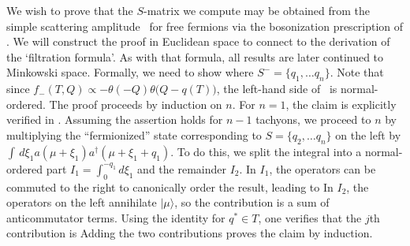  
 
We wish to prove that the $S$-matrix we compute may be obtained from the 
simple scattering amplitude \sff\ for free fermions via the bosonization
prescription of \bosnztion. We will construct the proof in Euclidean space to
connect to the derivation of the `filtration formula'. As with that formula,
all results are later continued to Minkowski space.
Formally, we need to show 
\eqn{}
where $S^- = \{q_1,\ldots q_n \}$.
Note that since 
$f_-(T,Q) \propto - \theta (-Q) \theta \big(Q-q(T)\big)$, the
left-hand side of \bozinc\ is normal-ordered.
The proof proceeds by induction on $n$. For $n = 1$, the claim is
explicitly verified in \bosnztion.
Assuming the assertion holds for $n-1$ tachyons, we proceed to $n$ by
multiplying the ``fermionized'' state corresponding to 
$S=\{q_2,\ldots q_n\}$
on the left by 
$\int\, d\xi_1 a (\mu + \xi_1) a^{\dagger}(\mu + \xi_1 + q_1)$. 
To do this, we split the integral into a
normal-ordered part $I_1 = \int_0^{-q_1} d\xi_1 $ and the remainder $I_2$.
In $I_1$, the operators can be commuted to the right to canonically order the
result, leading to
\eqn{}
In $I_2$, the operators on the left annihilate $|\mu\rangle$, so the
contribution is a sum of anticommutator terms. Using the identity
\eqn{}
for $q^* \in T$, one verifies that the $j$\/th contribution is
\eqn{}
Adding the two contributions proves the claim by induction.
 
\listrefs
\listfigs
 
\bye
 
